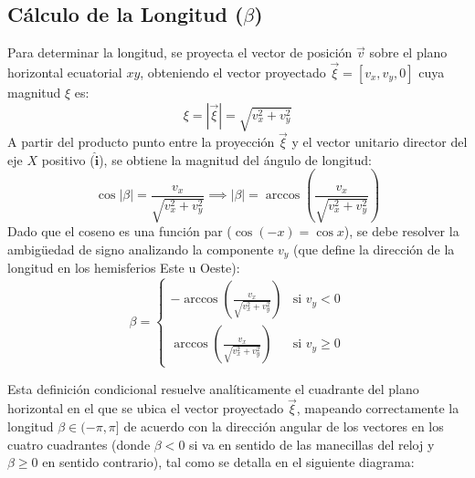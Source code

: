 \documentclass[12pt,a4paper]{article}
\begin{document}
\subsection{Cálculo de la Longitud ($\beta$)}
Para determinar la longitud, se proyecta el vector de posición $\vec{v}$ sobre el plano horizontal ecuatorial $xy$, obteniendo el vector proyectado $\vec{\xi} = [v_x, v_y, 0]$ cuya magnitud $\xi$ es:
\begin{equation}
    \xi = |\vec{\xi}| = \sqrt{v_x^2 + v_y^2}
\end{equation}
A partir del producto punto entre la proyección $\vec{\xi}$ y el vector unitario director del eje $X$ positivo ($\mathbf{\hat{i}}$), se obtiene la magnitud del ángulo de longitud:
\begin{equation}
    \cos|\beta| = \frac{v_x}{\sqrt{v_x^2 + v_y^2}} \implies |\beta| = \arccos \left( \frac{v_x}{\sqrt{v_x^2 + v_y^2}} \right)
\end{equation}
Dado que el coseno es una función par ($\cos(-x) = \cos x$), se debe resolver la ambigüedad de signo analizando la componente $v_y$ (que define la dirección de la longitud en los hemisferios Este u Oeste):
\begin{equation}
    \beta = \begin{cases} -\arccos \left( \frac{v_x}{\sqrt{v_x^2 + v_y^2}} \right) & \text{si } v_y < 0 \\ \arccos \left( \frac{v_x}{\sqrt{v_x^2 + v_y^2}} \right) & \text{si } v_y \ge 0 \end{cases}
\end{equation}

Esta definición condicional resuelve analíticamente el cuadrante del plano horizontal en el que se ubica el vector proyectado $\vec{\xi}$, mapeando correctamente la longitud $\beta \in (-\pi, \pi]$ de acuerdo con la dirección angular de los vectores en los cuatro cuadrantes (donde $\beta < 0$ si va en sentido de las manecillas del reloj y $\beta \ge 0$ en sentido contrario), tal como se detalla en el siguiente diagrama:
\end{document}
